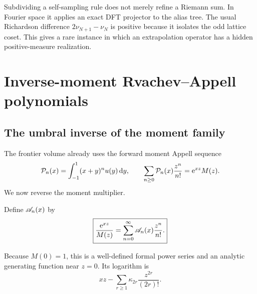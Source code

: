 \documentclass[11pt,oneside]{article}
\numberwithin{equation}{section}
\theoremstyle{definition}
\theoremstyle{remark}
\newcommand{\e}{\mathrm e}
\newcommand{\dd}{\,\mathrm d}
\begin{document}
\begin{resultbox}
Subdividing a self-sampling rule does not merely refine a Riemann sum.  In Fourier space it applies an exact DFT projector to the alias tree.  The usual Richardson difference $2\nu_{N+1}-\nu_N$ is positive because it isolates the odd lattice coset.  This gives a rare instance in which an extrapolation operator has a hidden positive-measure realization.
\end{resultbox}

\section{Inverse-moment Rvachev--Appell polynomials}
\label{p3:sec:appell}

\subsection{The umbral inverse of the moment family}

The frontier volume already uses the forward moment Appell sequence
\begin{equation}
 \Pcal_n(x)=\int_{-1}^{1}(x+y)^n u(y)\dd y,
 \qquad
 \sum_{n\ge0}\Pcal_n(x)\frac{z^n}{n!}=\e^{xz}M(z).
 \label{p3:eq:forward-Appell}
\end{equation}
We now reverse the moment multiplier.

\begin{definition}
\label{p3:def:inverse-Appell}
Define $\mathscr A_n(x)$ by
\begin{equation}
 \boxed{\displaystyle
 \frac{\e^{xz}}{M(z)}
 =\sum_{n=0}^{\infty}\Acal_n(x)\frac{z^n}{n!}.}
 \label{p3:eq:inverse-Appell-gen}
\end{equation}
\end{definition}

Because $M(0)=1$, this is a well-defined formal power series and an analytic generating function near $z=0$.  Its logarithm is
\begin{equation}
 xz-\sum_{r\ge1}\kappa_{2r}\frac{z^{2r}}{(2r)!}.
 \label{p3:eq:inverse-Appell-log}
\end{equation}
\end{document}
